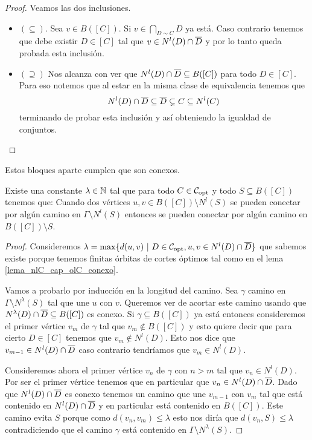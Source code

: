 \documentclass[tesis.tex]{subfiles}
\begin{document}
\begin{proof}
	Veamos las dos inclusiones.
	
	\begin{itemize}
		\item \textbf{$(\subseteq)$}. 
		Sea $v \in B([C])$. 
		Si $v \in \bigcap_{D \sim C} D$ ya está. 
		Caso contrario tenemos que debe existir $D \in [C]$ tal que $v \in N^l(D) \cap \overline D$ y por lo tanto queda probada esta inclusión.
		\item \textbf{$(\supseteq)$} 
		Nos alcanza con ver que $ N^l(D) \cap \overline D \subseteq B([C])$ para todo $D \in [C]$.
		Para eso notemos que al estar en la misma clase de equivalencia tenemos que 
		\[
			N^l(D) \cap \overline D \subseteq \overline D \subsetneq C \subseteq N^l(C)
		\]
		terminando de probar esta inclusión y así obteniendo la igualdad de conjuntos.
	\end{itemize}
\end{proof}

Estos bloques aparte cumplen que son conexos.

\begin{lema}\label{lema_conexion_B(C)}
	Existe una constante $\lambda \in \mathbb{N}$ tal que para todo $C \in {\cal C}_{\text{opt}}$ y todo $S \subseteq B([C])$ tenemos que: 
	Cuando dos vértices $u,v \in B([C]) \setminus N^l(S)$ se pueden conectar por algún camino en $\Gamma \setminus N^l(S)$ entonces se pueden conectar por algún camino en $B([C]) \setminus S$. 
\end{lema}

\begin{proof}
	Consideremos $\lambda = \max \{ d(u,v) \ | \ D \in {\cal C}_{\text{opt}}, u,v \in N^l(D) \cap \overline D  \}$ que sabemos existe porque tenemos finitas órbitas de cortes óptimos tal como en el lema \ref{lema_nlC_cap_olC_conexo}. 	
	
	Vamos a probarlo por inducción en la longitud del camino.
	Sea $\gamma$ camino en $\Gamma \setminus N^{\lambda}(S)$ tal que une $u$ con $v$.
	Queremos ver de acortar este camino usando que $N^{\lambda}(D) \cap \overline D \subseteq B([C])$ es conexo.
	Si $\gamma \subseteq B([C])$ ya está entonces consideremos el primer vértice $v_m$ de $\gamma$ tal que $v_m \notin B([C])$ y esto quiere decir que para cierto $D \in [C]$ tenemos que $v_m \notin N^l(D)$.
	Esto nos dice que $v_{m-1} \in N^l(D) \cap \overline D$ caso contrario tendríamos que $v_m \in N^l(D)$.
	
	Consideremos ahora el primer vértice $v_n$ de $\gamma$ con $n > m$ tal que $v_n \in N^l(D)$.
	Por ser el primer vértice tenemos que en particular que $v_n \in N^l(D) \cap \overline D$.
	Dado que $N^l(D) \cap \overline D$ es conexo tenemos un camino que une $v_{m-1}$ con $v_m$ tal que está contenido en $N^l(D) \cap \overline D$ y en particular está contenido en $B([C])$.
	Este camino evita $S$ porque como $d(v_n,v_m) \le \lambda$ esto nos diría que $d(v_n,S) \le \lambda$ contradiciendo que el camino $\gamma$ está contenido en $\Gamma \setminus N^{\lambda}(S)$.	
\end{proof}
\end{document}
